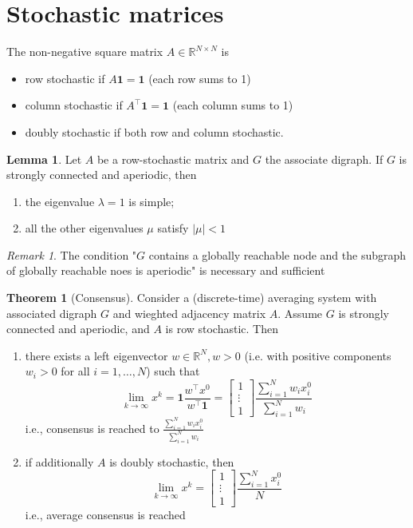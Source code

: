 \documentclass{book}
\newcommand{\R}{\mathbb{R}}
\theoremstyle{definition}
\newtheorem{theorem}{Theorem}[section]
\theoremstyle{remark}
\newtheorem*{remark}{Remark}
\theoremstyle{remark}
\theoremstyle{definition}
\newtheorem*{lemma}{Lemma}
\begin{document}
\section{Stochastic matrices}
The non-negative square matrix $A\in\R^{N\times N}$ is 
\begin{itemize}
    \item row stochastic if $A\mathbf{1}=\mathbf{1}$ (each row sums to 1)
    \item column stochastic if $A^\top \mathbf{1}=\mathbf{1}$ (each column sums to 1)
    \item doubly stochastic if both row and column stochastic.
\end{itemize}
\begin{lemma}
    Let $A$ be a row-stochastic matrix and $G$ the associate digraph. If $G$ is strongly connected and aperiodic, then 
    \begin{enumerate}
        \item the eigenvalue $\lambda=1$ is simple; 
        \item all the other eigenvalues $\mu$ satisfy $|\mu|<1$
    \end{enumerate}
\end{lemma}
\begin{remark}
    The condition "$G$ contains a globally reachable node and the subgraph of globally reachable noes is aperiodic" is necessary and sufficient
\end{remark}
\begin{theorem}[Consensus]
    Consider a (discrete-time) averaging system with associated digraph $G$ and wieghted adjacency matrix $A$. Assume $G$ is strongly connected and aperiodic, and $A$ is row stochastic. Then 
    \begin{enumerate}
        \item there exists a left eigenvector $w\in\R^N,w>0$ (i.e. with positive components $w_i>0$ for all $i=1,\dots,N$) such that 
            \[
                \lim_{k\to\infty}x^k = \mathbf{1}\displaystyle\frac{w^\top x^0}{w^\top \mathbf{1}} = \begin{bmatrix}
                    1 \\ \vdots \\ 1
                \end{bmatrix} \displaystyle\frac{\sum_{i=1}^{N}w_ix_i^0}{\sum_{i=1}^{N}w_i}
            \]
            i.e., consensus is reached to $ \displaystyle\frac{\sum_{i=1}^{N}w_ix_i^0}{\sum_{i=1}^{N}w_i}$
        \item if additionally $A$ is doubly stochastic, then 
            \[
                \lim_{k\to\infty}x^k = \begin{bmatrix}
                    1 \\ \vdots \\ 1
                \end{bmatrix} \displaystyle\frac{\sum_{i=1}^{N}x_i^0}{N}
            \]
            i.e., average consensus is reached
    \end{enumerate}
\end{theorem}
\end{document}
